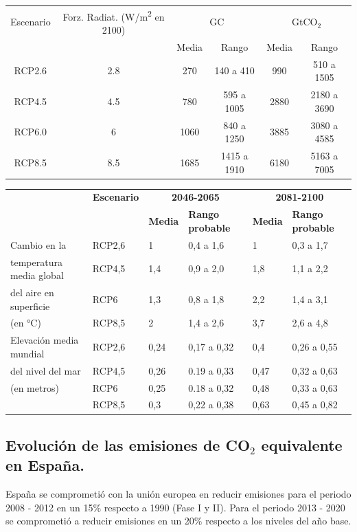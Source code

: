 \begin{table}[h]
	\centering
	\renewcommand{\arraystretch}{1.5}
	\begin{tabular}{cccccc}
		\hline
		Escenario & Forz. Radiat. (W/m\textsuperscript{2} en 2100) & \multicolumn{2}{c}{GC} & \multicolumn{2}{c}{GtCO$_2$} \\
		\cline{3-6}
		& &Media & Rango & Media & Rango \\
		\hline
		RCP2.6 & 2.8 & 270 & 140 a 410 & 990 & 510 a 1505 \\
		RCP4.5 & 4.5 & 780 & 595 a 1005 & 2880 & 2180 a 3690 \\
		RCP6.0 & 6 & 1060 & 840 a 1250 & 3885 & 3080 a 4585 \\
		RCP8.5 & 8.5 & 1685 & 1415 a 1910 & 6180 & 5163 a 7005 \\
		\hline 
	\end{tabular}
\end{table}

\begin{table}[H]
	\centering
	\renewcommand{\arraystretch}{1.5}
	\begin{tabular}{p{4cm}p{2cm}p{1cm}p{3cm}p{1cm}p{3cm}}
		\hline
		& \textbf{Escenario} &
		\multicolumn{2}{c}{\textbf{2046-2065}}  & \multicolumn{2}{c}{\textbf{2081-2100}} \\ 
	
		& &\textbf{Media} & \textbf{Rango probable} & \textbf{Media} &\textbf{Rango probable} \\ 
		\hline
		Cambio en la   & 
		RCP2,6 & 1 & 0,4 a 1,6 &1 &0,3 a 1,7\\
		temperatura media global&RCP4,5 & 1,4 & 0,9 a 2,0 &1,8 & 1,1 a 2,2 \\
		del aire en superficie & RCP6 & 1,3 & 0,8 a 1,8 & 2,2 & 1,4 a 3,1\\
		(en °C)& RCP8,5 & 2 & 1,4 a 2,6 & 3,7 & 2,6 a 4,8 \\
		\hline
		Elevación media mundial   & RCP2,6 & 0,24 & 0,17 a 0,32 & 0,4  & 0,26 a 0,55 \\
		del nivel del mar& RCP4,5 & 0,26 & 0.19 a 0,33 & 0,47 & 0,32 a 0,63 \\
		(en metros)& RCP6   & 0,25 & 0.18 a 0,32 & 0,48 & 0,33 a 0,63 \\
		& RCP8,5 & 0,3  & 0,22 a 0,38 & 0,63 & 0,45 a 0,82 \\
		\hline
	\end{tabular}
\end{table}
\newpage
\subsection{Evolución de las emisiones de CO$_2$ equivalente en España.}
España se comprometió con la unión europea en reducir emisiones para el periodo 2008 - 2012 en un 15\% respecto a 1990 (Fase I y II). Para el periodo 2013 - 2020 se comprometió a reducir emisiones en un 20\% respecto a los niveles del año base.
 
